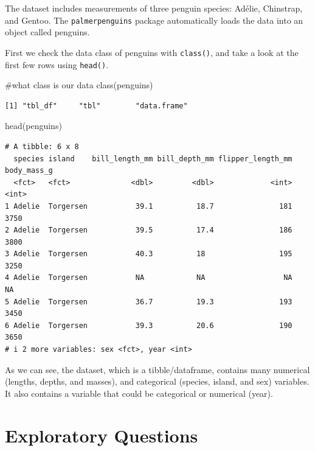 \documentclass[
  letterpaper,
  DIV=11,
  numbers=noendperiod]{scrreprt}
\newenvironment{Shaded}{\begin{snugshade}}{\end{snugshade}}
\newcommand{\CommentTok}[1]{\textcolor[rgb]{0.37,0.37,0.37}{#1}}
\newcommand{\FunctionTok}[1]{\textcolor[rgb]{0.28,0.35,0.67}{#1}}
\newcommand{\NormalTok}[1]{\textcolor[rgb]{0.00,0.23,0.31}{#1}}
\begin{document}
The dataset includes measurements of three penguin species: Adélie,
Chinstrap, and Gentoo. The \texttt{palmerpenguins} package automatically
loads the data into an object called penguins.

First we check the data class of penguins with \texttt{class()}, and
take a look at the first few rows using \texttt{head()}.

\begin{Shaded}
\begin{Highlighting}[]
\CommentTok{\#what class is our data}
\FunctionTok{class}\NormalTok{(penguins)}
\end{Highlighting}
\end{Shaded}

\begin{verbatim}
[1] "tbl_df"     "tbl"        "data.frame"
\end{verbatim}

\begin{Shaded}
\begin{Highlighting}[]
\FunctionTok{head}\NormalTok{(penguins)}
\end{Highlighting}
\end{Shaded}

\begin{verbatim}
# A tibble: 6 x 8
  species island    bill_length_mm bill_depth_mm flipper_length_mm body_mass_g
  <fct>   <fct>              <dbl>         <dbl>             <int>       <int>
1 Adelie  Torgersen           39.1          18.7               181        3750
2 Adelie  Torgersen           39.5          17.4               186        3800
3 Adelie  Torgersen           40.3          18                 195        3250
4 Adelie  Torgersen           NA            NA                  NA          NA
5 Adelie  Torgersen           36.7          19.3               193        3450
6 Adelie  Torgersen           39.3          20.6               190        3650
# i 2 more variables: sex <fct>, year <int>
\end{verbatim}

As we can see, the dataset, which is a tibble/dataframe, contains many
numerical (lengths, depths, and masses), and categorical (species,
island, and sex) variables. It also contains a variable that could be
categorical or numerical (year).

\section{Exploratory Questions}\label{exploratory-questions}
\end{document}
